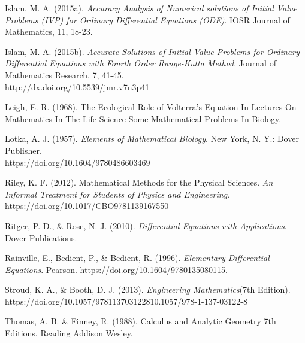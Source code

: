 \documentclass[11pt]{report}
\begin{document}
\begin{description}
		\item Islam, M. A. (2015a). \emph{Accuracy Analysis of Numerical solutions of Initial Value
		Problems (IVP) for Ordinary Differential Equations (ODE)}. IOSR Journal of Mathematics, 11, 18-23.
	
		\item Islam, M. A. (2015b). \emph{Accurate Solutions of Initial Value Problems for Ordinary Differential Equations with Fourth Order Runge-Kutta Method}. Journal of Mathematics Research, 7, 41-45. \\http://dx.doi.org/10.5539/jmr.v7n3p41
		
		\item Leigh, E. R. (1968). The Ecological Role of Volterra’s Equation In Lectures On Mathematics In The Life Science Some Mathematical Problems In Biology.
		
		\item Lotka, A. J. (1957). \emph{Elements of Mathematical Biology}. New York, N. Y.: Dover Publisher. \\
		https://doi.org/10.1604/9780486603469
		
		\item Riley, K. F. (2012). Mathematical Methods for the Physical Sciences. \emph{An Informal Treatment for Students of Physics and Engineering}.\\ https://doi.org/10.1017/CBO9781139167550
		
		\item Ritger, P. D., \& Rose, N. J. (2010). \emph{Differential Equations with Applications}. Dover Publications.
		
		\item Rainville, E., Bedient, P., \& Bedient, R. (1996). \emph{Elementary Differential Equations}. Pearson. https://doi.org/10.1604/9780135080115.		
		
		\item Stroud, K. A., \& Booth, D. J. (2013). \emph{Engineering Mathematics}(7th Edition). \\ https://doi.org/10.1057/978113703122810.1057/978-1-137-03122-8
		
		\item Thomas, A. B. \& Finney, R. (1988). Calculus and Analytic Geometry 7th Editions. Reading Addison Wesley.
	\end{description}
	
\end{document}
